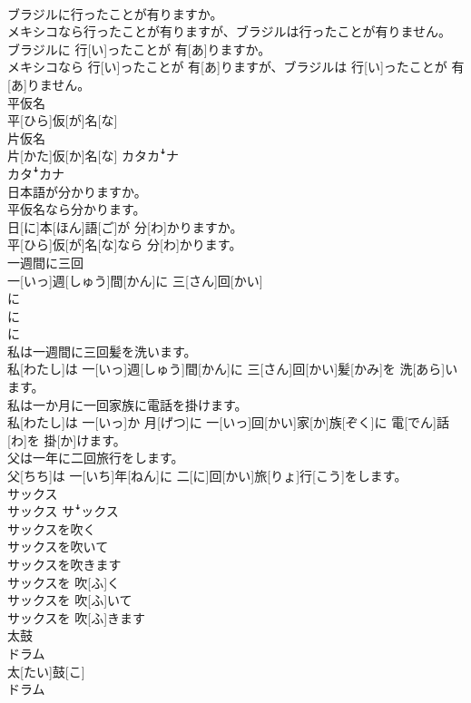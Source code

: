 \documentclass[8pt]{extreport}
\begin{document}
\begin{CJK}{UTF8}{min}
\\	ブラジルに行ったことが有りますか。 
\\	メキシコなら行ったことが有りますが、ブラジルは行ったことが有りません。	
\\	ブラジルに 行[い]ったことが 有[あ]りますか。 
\\	メキシコなら 行[い]ったことが 有[あ]りますが、ブラジルは 行[い]ったことが 有[あ]りません。
\\	平仮名	
\\	平[ひら]仮[が]名[な]	
\\	片仮名	
\\	片[かた]仮[か]名[な]	カタカꜜナ 
\\	カタꜜカナ
\\	日本語が分かりますか。 
\\	平仮名なら分かります。	
\\	日[に]本[ほん]語[ご]が 分[わ]かりますか。 
\\	平[ひら]仮[が]名[な]なら 分[わ]かります。
\\	一週間に三回	
\\	一[いっ]週[しゅう]間[かん]に 三[さん]回[かい]
\\	に 
\\	に 
\\	に 
\\	私は一週間に三回髪を洗います。	
\\	私[わたし]は 一[いっ]週[しゅう]間[かん]に 三[さん]回[かい]髪[かみ]を 洗[あら]います。
\\	私は一か月に一回家族に電話を掛けます。	
\\	私[わたし]は 一[いっ]か 月[げつ]に 一[いっ]回[かい]家[か]族[ぞく]に 電[でん]話[わ]を 掛[か]けます。
\\	父は一年に二回旅行をします。	
\\	父[ちち]は 一[いち]年[ねん]に 二[に]回[かい]旅[りょ]行[こう]をします。
\\	サックス	
\\	サックス	サꜜックス
\\	サックスを吹く 
\\	サックスを吹いて 
\\	サックスを吹きます	
\\	サックスを 吹[ふ]く 
\\	サックスを 吹[ふ]いて 
\\	サックスを 吹[ふ]きます
\\	太鼓 
\\	ドラム	
\\	太[たい]鼓[こ] 
\\	ドラム	

\end{CJK}
\end{document}
